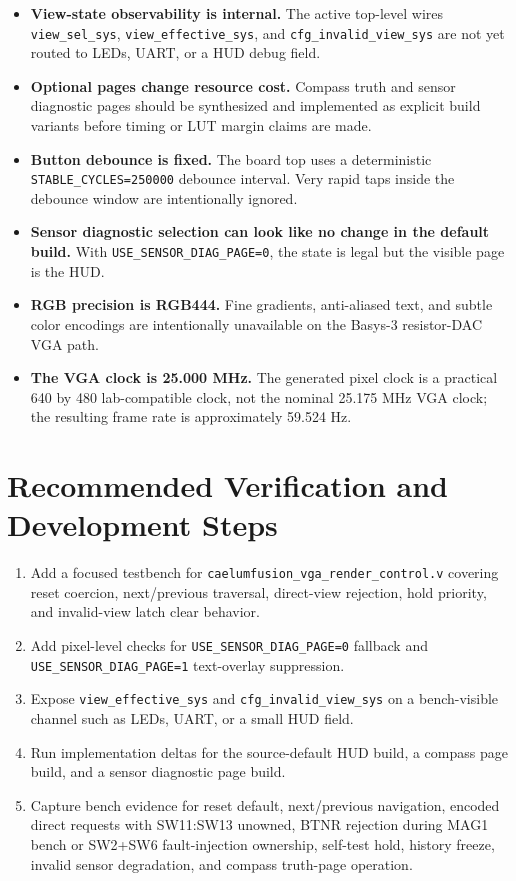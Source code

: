 \documentclass{article}
\newcommand{\sig}[1]{\begingroup\nolinkurl{#1}\endgroup}
\newcommand{\file}[1]{\begingroup\nolinkurl{#1}\endgroup}
\newcommand{\param}[1]{\begingroup\nolinkurl{#1}\endgroup}
\begin{document}
\begin{itemize}
  \item \textbf{View-state observability is internal.}  The active top-level
        wires \sig{view_sel_sys}, \sig{view_effective_sys}, and
        \sig{cfg_invalid_view_sys} are not yet routed to LEDs, UART, or a HUD
        debug field.
  \item \textbf{Optional pages change resource cost.}  Compass truth and sensor
        diagnostic pages should be synthesized and implemented as explicit
        build variants before timing or LUT margin claims are made.
  \item \textbf{Button debounce is fixed.}  The board top uses a deterministic
        \sig{STABLE_CYCLES=250000} debounce interval.  Very rapid taps inside
        the debounce window are intentionally ignored.
  \item \textbf{Sensor diagnostic selection can look like no change in the
        default build.}  With \param{USE_SENSOR_DIAG_PAGE=0}, the state is legal
        but the visible page is the HUD.
  \item \textbf{RGB precision is RGB444.}  Fine gradients, anti-aliased text,
        and subtle color encodings are intentionally unavailable on the Basys-3
        resistor-DAC VGA path.
  \item \textbf{The VGA clock is 25.000 MHz.}  The generated pixel clock is a
        practical 640 by 480 lab-compatible clock, not the nominal 25.175 MHz
        VGA clock; the resulting frame rate is approximately 59.524 Hz.
\end{itemize}

\section{Recommended Verification and Development Steps}

\begin{enumerate}
  \item Add a focused testbench for \file{caelumfusion_vga_render_control.v}
        covering reset coercion, next/previous traversal, direct-view rejection,
        hold priority, and invalid-view latch clear behavior.
  \item Add pixel-level checks for \param{USE_SENSOR_DIAG_PAGE=0} fallback and
        \param{USE_SENSOR_DIAG_PAGE=1} text-overlay suppression.
  \item Expose \sig{view_effective_sys} and \sig{cfg_invalid_view_sys} on a
        bench-visible channel such as LEDs, UART, or a small HUD field.
  \item Run implementation deltas for the source-default HUD build, a compass
        page build, and a sensor diagnostic page build.
  \item Capture bench evidence for reset default, next/previous navigation,
        encoded direct requests with SW11:SW13 unowned, BTNR rejection during
        MAG1 bench or SW2+SW6 fault-injection ownership, self-test hold,
        history freeze, invalid sensor degradation, and compass truth-page
        operation.
\end{enumerate}
\end{document}
